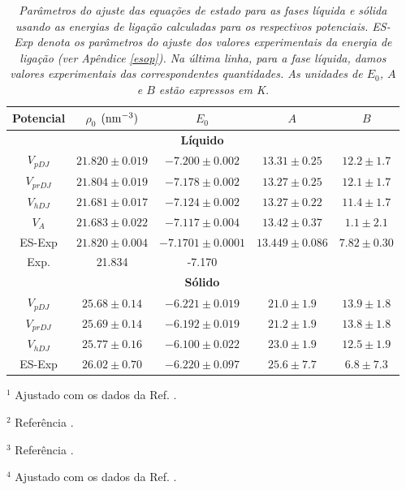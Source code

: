 \documentclass[12pt,twoside,a4paper]{report}
\begin{document}
\begin{table} [h]
\begin{center}
\caption{\label{parteo}
{\sl Parâmetros do ajuste das equações de estado para as fases líquida e sólida 
usando as energias de
ligação calculadas para os respectivos potenciais. ES-Exp denota os 
parâmetros do ajuste dos
valores experimentais da energia de ligação (ver Apêndice \ref{esop}). Na 
última linha, para a
fase líquida, damos valores experimentais das correspondentes quantidades. As 
unidades de
$E_0$, $A$ e $B$ estão expressos em K.}}
\vspace{0.7cm}
\begin{tabular}{|ccccc|}
\hline
\hline
Potencial & $\rho_0$ $(\rm{nm}^{-3})$ & $E_0$ & $A$ & $B$ \\
\hline
& \multicolumn{3}{c}{\rm \bf Líquido} &  \\
$V_{pDJ}$ & $21.820 \pm 0.019$ & $-7.200 \pm 0.002$ & $13.31 \pm 0.25$ & 
$12.2 \pm 1.7$ \\
$V_{prDJ}$ & $21.804 \pm 0.019$ & $-7.178 \pm 0.002$ & $13.27 \pm 0.25$ & 
$12.1 \pm 1.7$ \\
$V_{hDJ}$ & $21.681 \pm 0.017$ & $-7.124 \pm 0.002$ & $13.27 \pm 0.22$ & 
$11.4 \pm 1.7$ \\
$V_{A}$ & $21.683 \pm 0.022$ & $-7.117 \pm 0.004$ & $13.42 \pm 0.37$ & 
$1.1 \pm 2.1$
\\
ES-Exp\footnotemark[1] & $21.820 \pm 0.004$ & $-7.1701 \pm 0.0001$ & $13.449 
\pm 0.086$ & $7.82
\pm
0.30$ \\
Exp. & 21.834\footnotemark[2] & -7.170\footnotemark[3] & & \\
& \multicolumn{3}{c}{\rm \bf Sólido} &  \\
$V_{pDJ}$ & $25.68 \pm 0.14$ & $-6.221 \pm 0.019$ & $21.0 \pm 1.9$ & $13.9 
\pm 1.8$ \\
$V_{prDJ}$ & $25.69 \pm 0.14$ & $-6.192 \pm 0.019$ & $21.2 \pm 1.9$ & $13.8 
\pm 1.8$ \\
$V_{hDJ}$ & $25.77 \pm 0.16$ & $-6.100 \pm 0.022$ & $23.0 \pm 1.9$ & $12.5 
\pm 1.9$ \\
ES-Exp\footnotemark[4] & $26.02 \pm 0.70$ & $-6.220 \pm 0.097$ & $25.6 \pm 
7.7$ & $6.8 \pm 7.3$
\\
\hline
\end{tabular}
\end{center}

$^{1}$ {\rm \small Ajustado com os dados da Ref. \cite{bru87}.}

$^{2}$ {\rm \small Referência \cite{ber76}.}

$^{3}$ {\rm \small Referência \cite{bru87}.}

$^{4}$ {\rm \small Ajustado com os dados da Ref. \cite{edw65}.}

\vspace{2cm}
\end{table}
\end{document}
